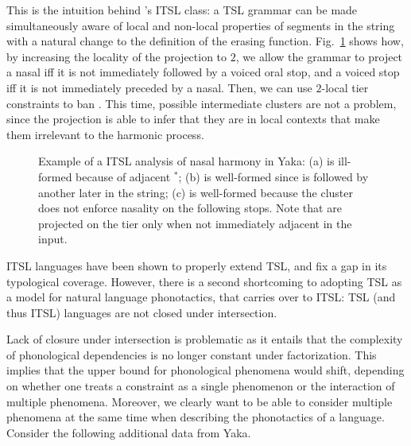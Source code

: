 \documentclass[11pt,a4paper]{article}
\begin{document}
This is the intuition behind  \citet{desanto2019structure}'s ITSL class: a TSL grammar  can be made simultaneously aware of local and non-local properties of segments in the string with a natural change to the definition of the erasing function.
Fig.~\ref{fig:YAKA2} shows how, by increasing the locality of the projection to $2$, we allow the grammar to project a nasal iff it is not immediately followed by a voiced oral stop, and a voiced stop iff it is not immediately preceded by a nasal.
Then, we can use $2$-local tier constraints to ban  \textipa{[nd]}.
This time,  possible intermediate clusters are not a problem, since the projection is able to infer that they are in local contexts that make them irrelevant to the harmonic process.

\begin{figure}[]
\begin{center}
       
    
      
        \end{center}
        \caption{Example of a ITSL analysis of nasal harmony in Yaka: (a) is ill-formed because of adjacent $^*$\textipa{[nd]}; (b) is well-formed since  \textipa{[n]} is followed by another  \textipa{[n]} later in the string; (c) is well-formed because the \textipa{[nd]} cluster does not enforce nasality on the following stops.  Note that \textipa{[n,d,g,N]} are projected on the tier only when not immediately adjacent in the input. }
        \label{fig:YAKA2}
        \end{figure}

ITSL languages have been shown to properly extend TSL, and fix a gap in its typological coverage. 
However, there is a second shortcoming to adopting TSL as a model for natural language phonotactics, that carries over to ITSL:  TSL (and thus ITSL) languages are not closed under intersection.

Lack of closure under intersection is problematic as it entails that the complexity of phonological dependencies is no longer constant under factorization.
This implies that the upper bound for phonological phenomena would shift, depending on whether one treats a constraint as a single phenomenon or the interaction of multiple phenomena.
Moreover, we clearly want to be able to consider multiple phenomena at the same time when describing the phonotactics of a language.
Consider the following additional data from Yaka.
\end{document}
